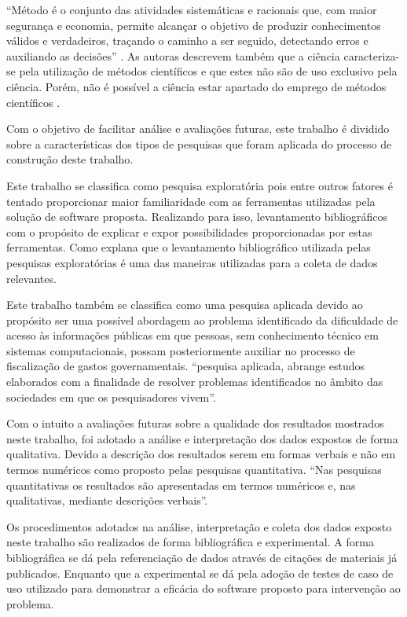 “Método é o conjunto das atividades sistemáticas e racionais que, com maior segurança e economia, permite alcançar o objetivo de produzir conhecimentos válidos e verdadeiros, traçando o caminho a ser seguido, detectando erros e auxiliando as decisões” \cite[p. 79]{Lakatos:2010}. As autoras descrevem também que a ciência caracteriza-se pela utilização de métodos científicos e que estes não são de uso exclusivo pela ciência. Porém, não é possível a ciência estar apartado do emprego de métodos científicos \cite{Lakatos:2010}.

Com o objetivo de facilitar análise e avaliações futuras, este trabalho é dividido sobre a características dos tipos de pesquisas que foram aplicada do processo de construção deste trabalho.

Este trabalho se classifica como pesquisa exploratória pois entre outros fatores é tentado proporcionar maior familiaridade com as ferramentas utilizadas pela solução de software proposta. Realizando para isso,  levantamento bibliográficos com o propósito de explicar e expor possibilidades proporcionadas por estas ferramentas. Como \cite{Gil:2010} explana que o levantamento bibliográfico utilizada pelas pesquisas exploratórias é uma das maneiras utilizadas para  a coleta de dados relevantes.

Este trabalho também se classifica como uma pesquisa aplicada devido ao propósito ser uma possível abordagem ao problema identificado da dificuldade de acesso às informações públicas em que pessoas, sem conhecimento técnico em sistemas computacionais, possam posteriormente auxiliar no processo de fiscalização de gastos governamentais. \cite[p. 25]{Gil:2010} “pesquisa aplicada, abrange estudos elaborados com a finalidade de resolver problemas identificados no âmbito das sociedades em que os pesquisadores vivem”.

Com o intuito a avaliações futuras sobre a qualidade dos resultados  mostrados neste trabalho, foi adotado a análise e interpretação dos dados expostos de forma qualitativa. Devido a descrição dos resultados serem em formas verbais e não em termos numéricos como proposto pelas pesquisas quantitativa. \cite[p. 39]{Gil:2010} “Nas pesquisas quantitativas os resultados são apresentadas em termos numéricos e, nas qualitativas, mediante descrições verbais”.

Os procedimentos adotados na análise, interpretação e coleta dos dados exposto neste trabalho são realizados de forma bibliográfica e experimental. A forma bibliográfica se dá pela referenciação de dados através de citações de materiais já publicados. Enquanto que a experimental se dá pela adoção de testes de caso de uso utilizado para demonstrar a eficácia do software proposto para intervenção ao problema.
